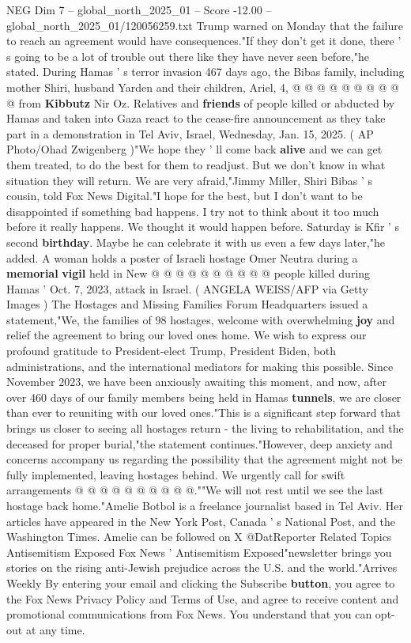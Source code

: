 \begin{textsample}{NEG Dim 7 – global\_north\_2025\_01 – Score -12.00 – global\_north\_2025\_01/120056259.txt}
Trump warned on Monday that the failure to reach an agreement would have consequences."If they don't get it done, there ' s going to be a lot of trouble out there like they have never seen before,"he stated.
During Hamas ' s terror invasion 467 days ago, the Bibas family, including mother Shiri, husband Yarden and their children, Ariel, 4, @ @ @ @ @ @ @ @ @ @ from \textbf{Kibbutz} Nir Oz.
Relatives and \textbf{friends} of people killed or abducted by Hamas and taken into Gaza react to the cease-fire announcement as they take part in a demonstration in Tel Aviv, Israel, Wednesday, Jan. 15, 2025. ( AP Photo/Ohad Zwigenberg )"We hope they ' ll come back \textbf{alive} and we can get them treated, to do the best for them to readjust.
But we don't know in what situation they will return.
We are very afraid,"Jimmy Miller, Shiri Bibas ' s cousin, told Fox News Digital."I hope for the best, but I don't want to be disappointed if something bad happens.
I try not to think about it too much before it really happens.
We thought it would happen before.
Saturday is Kfir ' s second \textbf{birthday}.
Maybe he can celebrate it with us even a few days later,"he added.
A woman holds a poster of Israeli hostage Omer Neutra during a \textbf{memorial} \textbf{vigil} held in New @ @ @ @ @ @ @ @ @ @ people killed during Hamas ' Oct. 7, 2023, attack in Israel. ( ANGELA WEISS/AFP via Getty Images ) The Hostages and Missing Families Forum Headquarters issued a statement,"We, the families of 98 hostages, welcome with overwhelming \textbf{joy} and relief the agreement to bring our loved ones home.
We wish to express our profound gratitude to President-elect Trump, President Biden, both administrations, and the international mediators for making this possible.
Since November 2023, we have been anxiously awaiting this moment, and now, after over 460 days of our family members being held in Hamas \textbf{tunnels}, we are closer than ever to reuniting with our loved ones."This is a significant step forward that brings us closer to seeing all hostages return - the living to rehabilitation, and the deceased for proper burial,"the statement continues."However, deep anxiety and concerns accompany us regarding the possibility that the agreement might not be fully implemented, leaving hostages behind.
We urgently call for swift arrangements @ @ @ @ @ @ @ @ @ @.""We will not rest until we see the last hostage back home."Amelie Botbol is a freelance journalist based in Tel Aviv.
Her articles have appeared in the New York Post, Canada ' s National Post, and the Washington Times.
Amelie can be followed on X @DatReporter Related Topics Antisemitism Exposed Fox News ' Antisemitism Exposed"newsletter brings you stories on the rising anti-Jewish prejudice across the U.S. and the world."Arrives Weekly By entering your email and clicking the Subscribe \textbf{button}, you agree to the Fox News Privacy Policy and Terms of Use, and agree to receive content and promotional communications from Fox News.
You understand that you can opt-out at any time.

\end{textsample}
